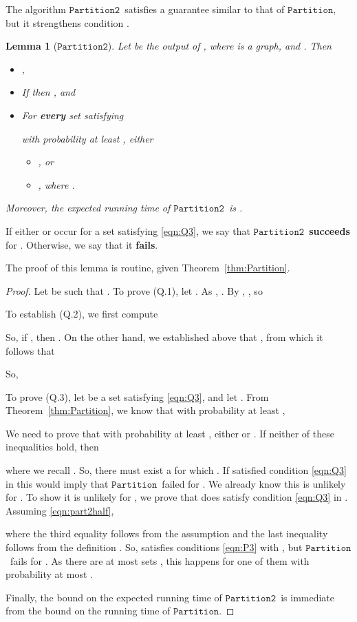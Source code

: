 \documentclass[11pt]{article}
\newtheorem{lemma}[theorem]{Lemma}
\newcommand{\partition}{\ensuremath{\mathtt{Partition}}}
\newcommand{\partitiontwo}{\ensuremath{\mathtt{Partition2}}}
\begin{document}
The algorithm \partitiontwo \ satisfies a guarantee similar to that of \partition,
  but it strengthens condition .

\begin{lemma}[\partitiontwo]\label{lem:partition2}
Let  be the output of ,
  where  is a graph,  and .
Then
\begin{itemize}
\item [(Q.1)] ,
\item [(Q.2)] If  then , and
\item [(Q.3)] For \textbf{every} set 
  satisfying

  with probability at least ,
  either
\begin{itemize}
\item [(Q.3.a)] , or
\item [(Q.3.b)] ,
  where .
\end{itemize}
\end{itemize}
Moreover, the expected running time of \partitiontwo \ is
  .
\end{lemma}
If either  or  occur
  for a set  satisfying \eqref{eqn:Q3},
  we say that \partitiontwo \
 \textbf{succeeds} for .
Otherwise, we say that it \textbf{fails}.

The proof of this lemma is routine, given Theorem~\ref{thm:Partition}.

\begin{proof}
Let  be such that .
To prove (Q.1),
  let .
As , .
By ,
  , so


To establish (Q.2),
  we first compute

So, if  ,
  then .
On the other hand, we established above that
  , from which
  it follows that

So,


To prove (Q.3),
  let  be a set satisfying \eqref{eqn:Q3}, and
  let .
From Theorem~\ref{thm:Partition}, we know that with probability at least
  ,

We need to prove that with probability at least ,
  either 
  or
  .
If neither of these inequalities hold, then

where we recall .
So, there must exist a  for which .
If  satisfied condition \eqref{eqn:Q3} 
  in  this would imply that
  \partition \ failed for .
We already know this is unlikely for .
To show it is unlikely for , we prove that  does
  satisfy condition \eqref{eqn:Q3} 
  in .
Assuming \eqref{eqn:part2half},

where the third equality follows from the assumption 
   and the last
  inequality follows from the definition
  .
So,  satisfies conditions \eqref{eqn:P3} 
  with , but \partition \ fails for .
As there are at most  sets , this happens for one of them with probability at most
  .

Finally, the bound on the expected running time of \partitiontwo \
  is immediate from the bound on the running time of \partition.
\end{proof}
\end{document}
